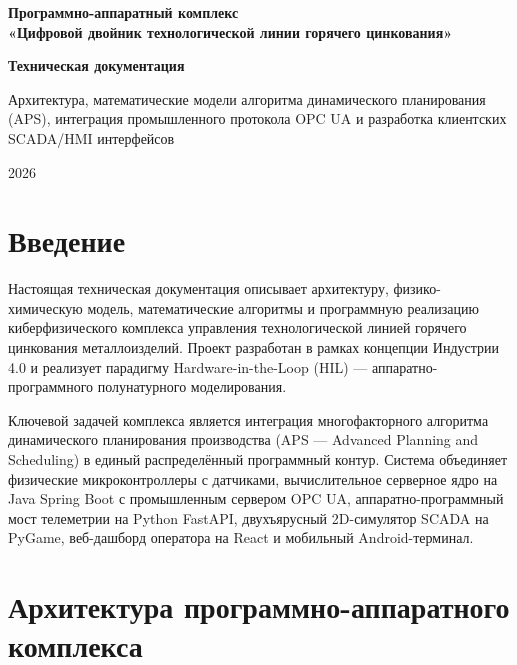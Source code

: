 \documentclass[14pt, a4paper]{extarticle}
\begin{document}
\begin{titlepage}
    \centering
    \vspace*{2cm}
    {\LARGE \bfseries Программно-аппаратный комплекс\\[0.5cm] «Цифровой двойник технологической линии горячего цинкования»\par}
    \vspace{1.5cm}
    {\Large \bfseries Техническая документация\par}
    \vspace{1cm}
    {\large Архитектура, математические модели алгоритма динамического планирования (APS), интеграция промышленного протокола OPC UA и разработка клиентских SCADA/HMI интерфейсов\par}
    \vfill
    {\large 2026 \par}
\end{titlepage}

\tableofcontents
\newpage

\section{Введение}

Настоящая техническая документация описывает архитектуру, физико-химическую модель, математические алгоритмы и программную реализацию киберфизического комплекса управления технологической линией горячего цинкования металлоизделий. Проект разработан в рамках концепции Индустрии 4.0 и реализует парадигму Hardware-in-the-Loop (HIL) --- аппаратно-программного полунатурного моделирования.

Ключевой задачей комплекса является интеграция многофакторного алгоритма динамического планирования производства (APS --- Advanced Planning and Scheduling) в единый распределённый программный контур. Система объединяет физические микроконтроллеры с датчиками, вычислительное серверное ядро на Java Spring Boot с промышленным сервером OPC UA, аппаратно-программный мост телеметрии на Python FastAPI, двухъярусный 2D-симулятор SCADA на PyGame, веб-дашборд оператора на React и мобильный Android-терминал.

\section{Архитектура программно-аппаратного комплекса}
\end{document}
